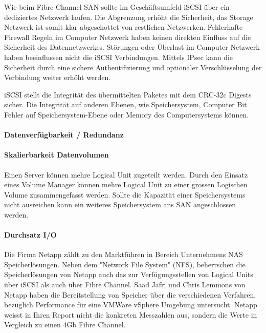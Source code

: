 Wie beim Fibre Channel SAN sollte im Geschäftsumfeld iSCSI über ein dediziertes Netzwerk laufen. Die Abgrenzung erhöht die Sicherheit, das Storage Netzwerk ist somit klar abgeschottet von restlichen Netzwerken. Fehlerhafte Firewall Regeln im Computer Netzwerk haben keinen direkten Einfluss auf die Sicherheit des Datennetzwerkes. Störungen oder Überlast im Computer Netzwerk haben beeinflussen nicht die iSCSI Verbindungen. Mittels IPsec kann die Sicherheit durch eine sichere Authentifizierung und optionaler Verschlüsselung der Verbindung weiter erhöht werden. 

iSCSI stellt die Integrität des übermittelten Paketes mit dem CRC-32c Digests sicher. Die Integrität auf anderen Ebenen, wie Speichersystem, Computer Bit Fehler auf Speichersystem-Ebene oder Memory des Computersystems können. 

\paragraph*{Datenverfügbarkeit / Redundanz}


\paragraph*{Skalierbarkeit Datenvolumen}
Einen Server können mehre Logical Unit zugeteilt werden. Durch den Einsatz eines Volume Manager können mehre Logical Unit zu einer grossen Logischen Volume zusammengefasst werden. Sollte die Kapazität einer Speichersystems nicht ausreichen kann ein weiteres Speichersystem ans SAN angeschlossen werden.

\paragraph*{Durchsatz I/O}\label{DurchsatzIO}
Die Firma Netapp zählt zu den Marktführen in Bereich Unternehmens NAS Speicherlösungen. Neben dem "Network File System" (NFS), beherrschen die Speicherlösungen von Netapp auch das zur Verfügungsstellen von Logical Units über iSCSI als auch über Fibre Channel. Saad Jafri und Chris Lemmons von Netapp haben die Bereitstellung von Speicher über die verschiedenen Verfahren, bezüglich Performance für eine VMWare vSphere Umgebung untersucht. Netapp weisst in Ihren Report nicht die konkreten Messzahlen aus, sondern die Werte in Vergleich zu einen 4Gb Fibre Channel.

